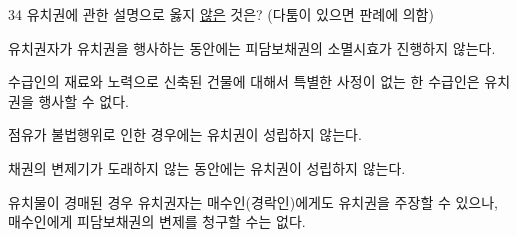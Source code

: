 \begin{question}{34}
유치권에 관한 설명으로 옳지 \uline{않은} 것은? (다툼이 있으면 판례에 의함)
\begin{choices}
  \item 유치권자가 유치권을 행사하는 동안에는 피담보채권의 소멸시효가 진행하지 않는다.
  \item 수급인의 재료와 노력으로 신축된 건물에 대해서 특별한 사정이 없는 한 수급인은 유치권을 행사할 수 없다.
  \item 점유가 불법행위로 인한 경우에는 유치권이 성립하지 않는다.
  \item 채권의 변제기가 도래하지 않는 동안에는 유치권이 성립하지 않는다.
  \item 유치물이 경매된 경우 유치권자는 매수인(경락인)에게도 유치권을 주장할 수 있으나, 매수인에게 피담보채권의 변제를 청구할 수는 없다.
\end{choices}
\end{question}
